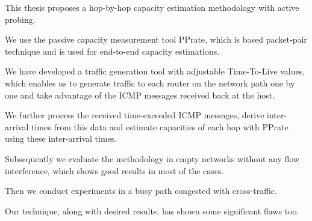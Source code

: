 \small

This thesis proposes a hop-by-hop capacity estimation methodology  with active probing.

We use the passive capacity measurement tool PPrate, which is based packet-pair technique and is used for end-to-end capacity estimations.

We have developed a traffic generation tool with adjustable Time-To-Live values, which enables us to generate traffic to each router on the network path one by one and take advantage of the ICMP messages received back at the host.

We further process the received time-exceeded ICMP messages, derive inter-arrival times from this data and estimate capacities of each hop with PPrate using these inter-arrival times.

Subsequently we evaluate the methodology in empty networks without any flow interference, which shows good results in most of the cases.

Then we conduct experiments in a busy path congested with cross-traffic.

Our technique, along with desired results, has shown some significant flaws too.